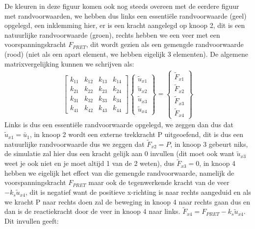 \documentclass[a4paper,11pt,twoside]{report}
\begin{document}
De kleuren in deze figuur komen ook nog steeds overeen met de eerdere figuur met randvoorwaarden, we
hebben dus links een essentiële randvoorwaarde (geel) opgelegd, een inklemming hier, er is een
kracht aangelegd op knoop 2, dit is een natuurlijke randvoorwaarde (groen), rechts hebben we een
veer met een voorspanningskracht $F_{PRET}$, dit wordt gezien als een gemengde randvoorwaarde (rood)
(niet als een apart element, we hebben eigelijk 3 elementen). De algemene matrixvergelijking kunnen
we schrijven als:
\begin{align*}
    \begin{bmatrix}
        k_{11} & k_{12} & k_{13} & k_{14} \\
        k_{21} & k_{22} & k_{23} & k_{24} \\
        k_{31} & k_{32} & k_{33} & k_{34} \\
        k_{41} & k_{42} & k_{43} & k_{44}
    \end{bmatrix}
    \begin{Bmatrix}
        \tilde{u}_{x1} \\
        \tilde{u}_{x2} \\
        \tilde{u}_{x3} \\
        \tilde{u}_{x4}
    \end{Bmatrix} =
    \begin{Bmatrix}
        \tilde{F}_{x1} \\
        \tilde{F}_{x2} \\
        \tilde{F}_{x3} \\
        \tilde{F}_{x4}
    \end{Bmatrix}
\end{align*}
Links is dus een essentiële randvoorwaarde opgelegd, we zeggen dan dus dat
$\tilde{u}_{x1} = \bar{u}_1$, in knoop 2 wordt een externe trekkracht P uitgeoefend, dit is dus een
natuurlijke randvoorwaarde dus we zeggen dat $\tilde{F}_{x2} = P$, in knoop 3 gebeurt niks, de
simulatie zal hier dus een kracht gelijk aan 0 invullen (dit moet ook want $\tilde{u}_{x3}$ weet je
ook niet en je moet altijd 1 van de 2 weten), dus $\tilde{F}_{x3} = 0$, in knoop 4 hebben we
eigelijk het effect van die gemengde randvoorwaarde, namelijk de voorspanningskracht $F_{PRET}$ maar
ook de tegenwerkende kracht van de veer $-k_s \tilde{u}_{x4}$, dit is negatief want de positieve
x-richting is naar rechts aangeduid en als we kracht P naar rechts doen zal de beweging in knoop 4
naar rechts gaan dus en dan is de reactiekracht door de veer in knoop 4 naar links.
$\tilde{F}_{x4} = F_{PRET} - k_s \tilde{u}_{x4}$. Dit invullen geeft:
\end{document}
